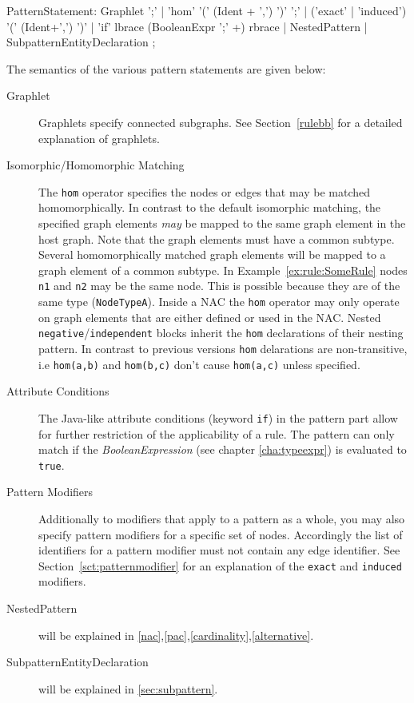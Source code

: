 \begin{rail}  
  PatternStatement: 
    Graphlet ';' |
    'hom' '(' (Ident + ',') ')' ';' |
    ('exact' | 'induced') '(' (Ident+',') ')' |
    'if' lbrace (BooleanExpr ';' +) rbrace |
    NestedPattern |
    SubpatternEntityDeclaration
    ;
\end{rail}
The semantics of the various pattern statements are given below:
\begin{description}
  \item[Graphlet] Graphlets specify connected subgraphs. See Section~\ref{rulebb} for a detailed explanation of graphlets.
  \item[Isomorphic/Homomorphic Matching] The \texttt{hom} operator specifies the nodes or edges that may be matched homomorphically. 
  In contrast to the default isomorphic matching, the specified graph elements \emph{may} be mapped to the same graph element in the host graph. Note that the graph elements must have a common subtype. 
  Several homomorphically matched graph elements will be mapped to a graph element of a common subtype.
  In Example~\ref{ex:rule:SomeRule} nodes \texttt{n1} and \texttt{n2} may be the same node. This is possible because they are of the same type (\texttt{NodeTypeA}).
  Inside a NAC the \texttt{hom} operator may only operate on graph elements that are either defined or used in the NAC.
  Nested \texttt{negative}/\texttt{independent} blocks inherit the \texttt{hom} declarations of their nesting pattern.
  In contrast to previous versions \texttt{hom} delarations are non-transitive, i.e \texttt{hom(a,b)} and \texttt{hom(b,c)} don't cause \texttt{hom(a,c)} unless specified.
  \item[Attribute Conditions] The Java-like attribute conditions (keyword \texttt{if}) in the pattern part allow for further restriction of the applicability of a rule. The pattern can only match if the \emph{BooleanExpression} (see chapter \ref{cha:typeexpr}) is evaluated to \texttt{true}.
  \item[Pattern Modifiers] Additionally to modifiers that apply to a pattern as a whole, you may also specify pattern modifiers for a specific set of nodes. Accordingly the list of identifiers for a pattern modifier must not contain any edge identifier. See Section~\ref{sct:patternmodifier} for an explanation of the \texttt{exact} and \texttt{induced} modifiers. 
  \item[NestedPattern] will be explained in \ref{nac},\ref{pac},\ref{cardinality},\ref{alternative}.
  \item[SubpatternEntityDeclaration] will be explained in \ref{sec:subpattern}.
\end{description}

